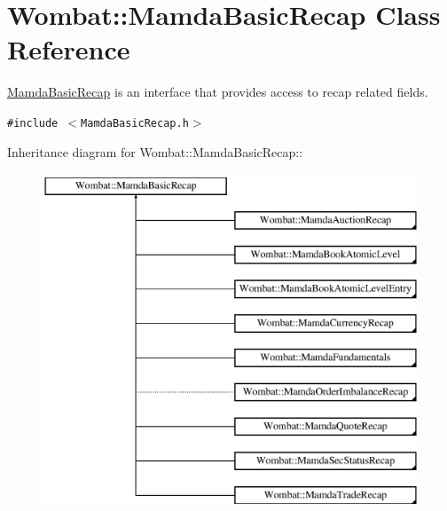 \hypertarget{classWombat_1_1MamdaBasicRecap}{
\section{Wombat::Mamda\-Basic\-Recap Class Reference}
\label{classWombat_1_1MamdaBasicRecap}
}
\hyperlink{classWombat_1_1MamdaBasicRecap}{Mamda\-Basic\-Recap} is an interface that provides access to recap related fields.  


{\tt \#include $<$Mamda\-Basic\-Recap.h$>$}

Inheritance diagram for Wombat::Mamda\-Basic\-Recap::\begin{figure}[H]
\begin{center}
\leavevmode
\includegraphics[height=10cm]{classWombat_1_1MamdaBasicRecap}
\end{center}
\end{figure}
